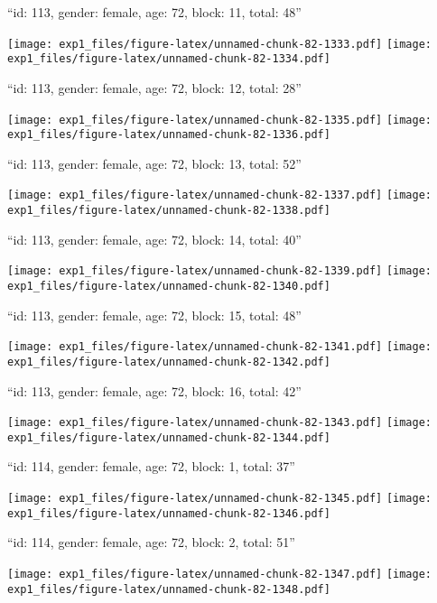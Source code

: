 \documentclass[11pt,,]{article}
\begin{document}
\newpage
[1] 

``id: 113, gender: female, age: 72, block: 11, total: 48''

\texttt{[image: exp1\_files/figure-latex/unnamed-chunk-82-1333.pdf]}
\texttt{[image: exp1\_files/figure-latex/unnamed-chunk-82-1334.pdf]}

\newpage
[1] 

``id: 113, gender: female, age: 72, block: 12, total: 28''

\texttt{[image: exp1\_files/figure-latex/unnamed-chunk-82-1335.pdf]}
\texttt{[image: exp1\_files/figure-latex/unnamed-chunk-82-1336.pdf]}

\newpage
[1] 

``id: 113, gender: female, age: 72, block: 13, total: 52''

\texttt{[image: exp1\_files/figure-latex/unnamed-chunk-82-1337.pdf]}
\texttt{[image: exp1\_files/figure-latex/unnamed-chunk-82-1338.pdf]}

\newpage
[1] 

``id: 113, gender: female, age: 72, block: 14, total: 40''

\texttt{[image: exp1\_files/figure-latex/unnamed-chunk-82-1339.pdf]}
\texttt{[image: exp1\_files/figure-latex/unnamed-chunk-82-1340.pdf]}

\newpage
[1] 

``id: 113, gender: female, age: 72, block: 15, total: 48''

\texttt{[image: exp1\_files/figure-latex/unnamed-chunk-82-1341.pdf]}
\texttt{[image: exp1\_files/figure-latex/unnamed-chunk-82-1342.pdf]}

\newpage
[1] 

``id: 113, gender: female, age: 72, block: 16, total: 42''

\texttt{[image: exp1\_files/figure-latex/unnamed-chunk-82-1343.pdf]}
\texttt{[image: exp1\_files/figure-latex/unnamed-chunk-82-1344.pdf]}

\newpage
[1] 

``id: 114, gender: female, age: 72, block: 1, total: 37''

\texttt{[image: exp1\_files/figure-latex/unnamed-chunk-82-1345.pdf]}
\texttt{[image: exp1\_files/figure-latex/unnamed-chunk-82-1346.pdf]}

\newpage
[1] 

``id: 114, gender: female, age: 72, block: 2, total: 51''

\texttt{[image: exp1\_files/figure-latex/unnamed-chunk-82-1347.pdf]}
\texttt{[image: exp1\_files/figure-latex/unnamed-chunk-82-1348.pdf]}
\end{document}
